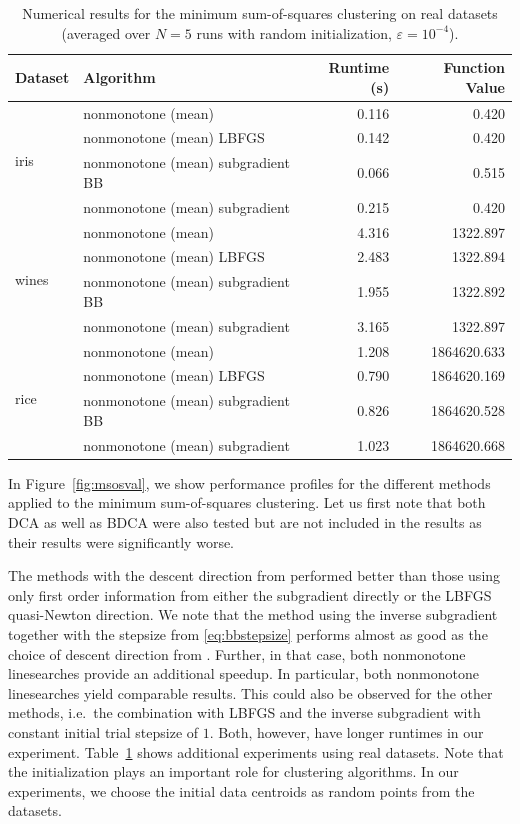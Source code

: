 \documentclass[a4paper, 12pt]{article}
\numberwithin{equation}{section}
\theoremstyle{bolddef}
\theoremstyle{definition}
\theoremstyle{boldplain}
\begin{document}
\begin{table}[ht]
\centering
\begin{tabular}{llrr}
\toprule
Dataset & Algorithm & Runtime (s) & Function Value\\
\midrule
\multirow{4}{*}{iris}
& nonmonotone (mean) & 0.116 & 0.420 \\
& nonmonotone (mean) LBFGS & 0.142 & 0.420 \\
& nonmonotone (mean) subgradient BB & 0.066 & 0.515 \\
& nonmonotone (mean) subgradient & 0.215 & 0.420 \\\hline
\multirow{4}{*}{wines}
& nonmonotone (mean) & 4.316 & 1322.897 \\
& nonmonotone (mean) LBFGS & 2.483 & 1322.894 \\
& nonmonotone (mean) subgradient BB & 1.955 & 1322.892 \\
& nonmonotone (mean) subgradient & 3.165 & 1322.897 \\\hline
\multirow{4}{*}{rice}
& nonmonotone (mean) & 1.208 & 1864620.633 \\
& nonmonotone (mean) LBFGS & 0.790 & 1864620.169 \\
& nonmonotone (mean) subgradient BB & 0.826 & 1864620.528 \\
& nonmonotone (mean) subgradient & 1.023 & 1864620.668 \\
\bottomrule
\end{tabular}
\caption{Numerical results for the minimum sum-of-squares clustering on real datasets (averaged over $N=5$ runs with random initialization, $\varepsilon = 10^{-4}$).}\label{tab:msosrealdata}
\end{table}

In Figure~\ref{fig:msosval}, we show performance profiles for the different methods applied to the minimum sum-of-squares clustering. Let us first note that both DCA as well as BDCA were also tested but are not included in the results as their results were significantly worse.

The methods with the descent direction from \cite{aragon2025} performed better than those using only first order information from either the subgradient directly or the LBFGS quasi-Newton direction. We note that the method using the inverse subgradient together with the stepsize from \eqref{eq:bbstepsize} performs almost as good as the choice of descent direction from \cite{aragon2025}. Further, in that case, both nonmonotone linesearches provide an additional speedup. In particular, both nonmonotone linesearches yield comparable results. This could also be observed for the other methods, i.e.\ the combination with LBFGS and the inverse subgradient with constant initial trial stepsize of $1$. Both, however, have longer runtimes in our experiment. Table~\ref{tab:msosrealdata} shows additional experiments using real datasets. Note that the initialization plays an important role for clustering algorithms. In our experiments, we choose the initial data centroids as random points from the datasets.
\end{document}
